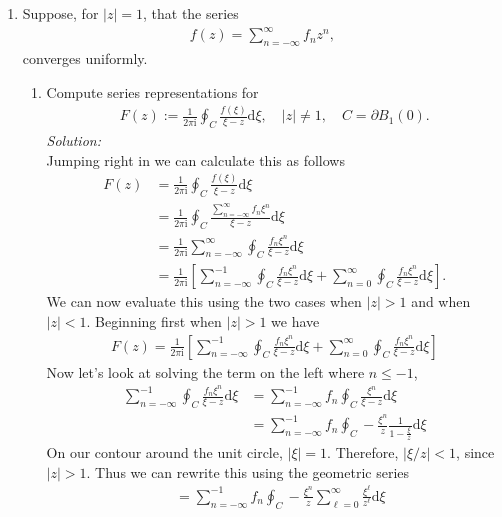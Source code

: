 \documentclass[10pt]{amsart}
\newcommand{\D}{\mathrm{d}}
\newcommand{\I}{\mathrm{i}}
\theoremstyle{nonumberplain}
\begin{document}
\begin{enumerate}[label={\bf {\arabic*}:}]
\item Suppose, for $|z| = 1$, that the series
\begin{align*}
f(z) = \sum_{n = -\infty}^\infty f_n z^n,
\end{align*}
converges uniformly.
\begin{enumerate}
\item Compute series representations for
\begin{align*}
F(z) := \frac{1}{2 \pi \I} \oint_{C} \frac{f(\xi)}{\xi - z} \D \xi,
\quad |z| \neq 1, \quad C = \partial B_1(0).
\end{align*}
\textit{Solution:} \\
Jumping right in we can calculate this as follows
\begin{align*}
F(z) &= \frac{1}{2 \pi \I} \oint_{C} \frac{f(\xi)}{\xi - z} \D \xi \\
	&= \frac{1}{2 \pi \I} \oint_{C} \frac{ \sum_{n = -\infty}^\infty f_n \xi^n }{\xi - z} \D \xi \\
	&= \frac{1}{2 \pi \I}  \sum_{n = -\infty}^\infty \oint_{C} \frac{ f_n \xi^n }{\xi - z} \D \xi \\
	&= \frac{1}{2 \pi \I} \left[
		\sum_{n = -\infty}^{-1} \oint_{C} \frac{ f_n \xi^n }{\xi - z} \D \xi
		+ \sum_{n = 0}^\infty \oint_{C} \frac{ f_n \xi^n }{\xi - z} \D \xi
	\right].
\end{align*}
We can now evaluate this using the two cases when $|z| > 1$ and when $|z| < 1$.
Beginning first when $|z| > 1$ we have
\begin{align}
F(z) = \frac{1}{2 \pi \I} \left[
		\sum_{n = -\infty}^{-1} \oint_{C} \frac{ f_n \xi^n }{\xi - z} \D \xi
		+ \sum_{n = 0}^\infty \oint_{C} \frac{ f_n \xi^n }{\xi - z} \D \xi
	\right]
\label{eq:z_greater_than_1}
\end{align}
Now let's look at solving the term on the left where $n \leq -1$,
\begin{align*}
\sum_{n = -\infty}^{-1} \oint_{C} \frac{ f_n \xi^n }{\xi - z} \D \xi
	&= \sum_{n = -\infty}^{-1} f_n \oint_{C} \frac{ \xi^n }{\xi - z} \D \xi \\
	&= \sum_{n = -\infty}^{-1} f_n \oint_{C} - \frac {\xi^n} z \frac 1 {1 - \frac \xi z } \D \xi
\end{align*}
On our contour around the unit circle, $|\xi| = 1$.
Therefore, $|\xi / z| < 1$, since $|z| > 1$.
Thus we can rewrite this using the geometric series
\begin{align*}
&= \sum_{n = -\infty}^{-1} f_n \oint_{C} - \frac {\xi^n} z \sum_{\ell = 0}^\infty \frac {\xi^\ell}{z^\ell} \D \xi \\

\end{align*}
\end{enumerate}
\end{enumerate}
\end{document}

